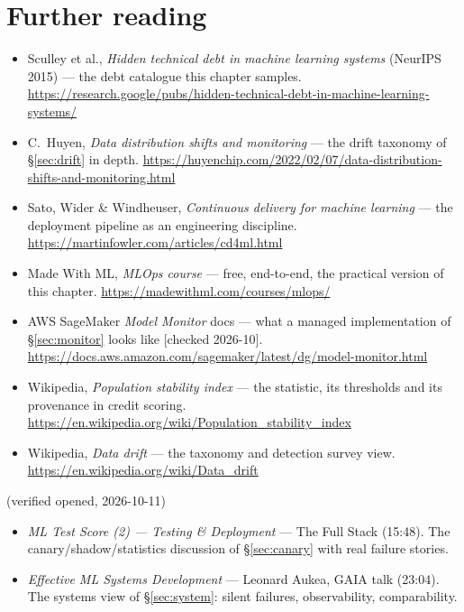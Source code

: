 \section*{Further reading}
\label{sec:further14}
\begin{itemize}
\item Sculley et al., \emph{Hidden technical debt in machine learning
systems} (NeurIPS 2015) --- the debt catalogue this chapter samples.
\url{https://research.google/pubs/hidden-technical-debt-in-machine-learning-systems/}
\item C.~Huyen, \emph{Data distribution shifts and monitoring}
--- the drift taxonomy of \S\ref{sec:drift} in depth.
\url{https://huyenchip.com/2022/02/07/data-distribution-shifts-and-monitoring.html}
\item Sato, Wider \& Windheuser, \emph{Continuous delivery for
machine learning} --- the deployment pipeline as an engineering
discipline. \url{https://martinfowler.com/articles/cd4ml.html}
\item Made With ML, \emph{MLOps course} --- free, end-to-end,
the practical version of this chapter.
\url{https://madewithml.com/courses/mlops/}
\item AWS SageMaker \emph{Model Monitor} docs --- what a managed
implementation of \S\ref{sec:monitor} looks like [checked 2026-10].
\url{https://docs.aws.amazon.com/sagemaker/latest/dg/model-monitor.html}
\item Wikipedia, \emph{Population stability index} --- the statistic,
its thresholds and its provenance in credit scoring.
\url{https://en.wikipedia.org/wiki/Population_stability_index}
\item Wikipedia, \emph{Data drift} --- the taxonomy and detection
survey view. \url{https://en.wikipedia.org/wiki/Data_drift}
\end{itemize}

\begin{rulebox}
(verified opened, 2026-10-11)
\begin{itemize}
\item \emph{ML Test Score (2) --- Testing \& Deployment} ---
The Full Stack (15:48). The canary/shadow/statistics discussion of
\S\ref{sec:canary} with real failure stories.
\item \emph{Effective ML Systems Development} --- Leonard Aukea,
GAIA talk (23:04). The systems view of \S\ref{sec:system}: silent
failures, observability, comparability.
\end{itemize}
\end{rulebox}

